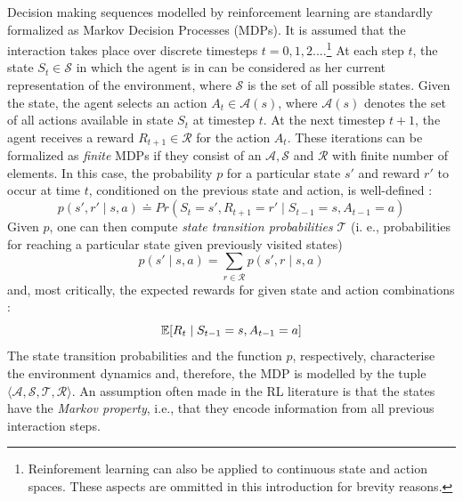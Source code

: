 Decision making sequences modelled by reinforcement learning are standardly formalized as Markov Decision Processes (MDPs). 
It is assumed that the interaction takes place over discrete timesteps $t = 0,1,2 ...$.\footnote{Reinforement learning can also be applied to continuous state and action spaces. These aspects are ommitted in this introduction for brevity reasons.} At each step $t$, the state $S_t \in \mathcal{S}$ in which the agent is in can be considered as her current representation of the environment, where $\mathcal{S}$ is the set of all possible states. Given the state, the agent selects an action $A_t \in \mathcal{A}(s)$, where $\mathcal{A}(s)$ denotes the set of all actions available in state $S_t$ at timestep $t$. At the next timestep $t+1$, the agent receives a reward $R_{t+1} \in \mathcal{R}$ for the action $A_t$. These iterations can be formalized as \textit{finite} MDPs if they consist of an $\mathcal{A}, \mathcal{S}$ and $\mathcal{R}$ with finite number of elements. In this case, the probability $p$ for a particular state $s'$ and reward $r'$ to occur at time $t$, conditioned on the previous state and action, is well-defined \parencite[][p. 48]{sutton2018reinforcement}:  
\begin{equation}
p(s', r' \mid s, a) \doteq Pr(S_t = s', R_{t+1} = r' \mid S_{t-1} = s, A_{t-1} = a)
\end{equation}
Given $p$, one can then compute \textit{state transition probabilities} $\mathcal{T}$ (i. e., probabilities for reaching a particular state given previously visited states) 
\begin{equation}
p(s' \mid s, a) = \sum_{r \in \mathcal{R} } p(s', r \mid s, a)
\end{equation}
and, most critically, the expected rewards for given state and action combinations \parencite[][p. 49]{sutton2018reinforcement}: 
\begin{equation}
\operatorname*{\mathbb{E}} [R_t \mid S_{t-1}=s, A_{t-1}=a]
\end{equation}
The state transition probabilities and the function $p$, respectively, characterise the environment dynamics and, therefore, the MDP is modelled by the tuple $\langle \mathcal{A}, \mathcal{S}, \mathcal{T}, \mathcal{R} \rangle $. An assumption often made in the RL literature is that the states have the \textit{Markov property}, i.e., that they encode information from all previous interaction steps.

